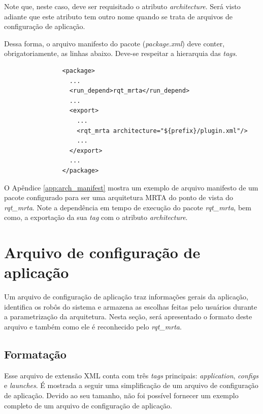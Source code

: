             Note que, neste caso, deve ser requisitado o atributo \textit{architecture}. Será visto adiante que este atributo tem outro nome quando se trata de arquivos de configuração de aplicação.
            
            Dessa forma, o arquivo manifesto do pacote (\textit{package.xml}) deve conter, obrigatoriamente, as linhas abaixo. Deve-se respeitar a hierarquia das \textit{tags}.
            
            \begin{lstlisting}
                <package>
                  ...
                  <run_depend>rqt_mrta</run_depend>
                  ...
                  <export>
                    ...
                    <rqt_mrta architecture="${prefix}/plugin.xml"/>
                    ...
                  </export>
                  ...
                </package>
            \end{lstlisting}
            
            O Apêndice \ref{app:arch_manifest} mostra um exemplo de arquivo manifesto de um pacote configurado para ser uma arquitetura MRTA do ponto de vista do \textit{rqt\_mrta}. Note a dependência em tempo de execução do pacote \textit{rqt\_mrta}, bem como, a exportação da sua \textit{tag} com o atributo \textit{architecture}.
    
    \section{Arquivo de configuração de aplicação} \label{sec:app_config}
        Um arquivo de configuração de aplicação traz informações gerais da aplicação, identifica os robôs do sistema e armazena as escolhas feitas pelo usuários durante a parametrização da arquitetura. Nesta seção, será apresentado o formato deste arquivo e também como ele é reconhecido pelo \textit{rqt\_mrta}.
        
        \subsection{Formatação} \label{subsec:app_config_fmt}
            Esse arquivo de extensão XML conta com três \textit{tags} principais: \textit{application}, \textit{configs} e \textit{launches}. É mostrada a seguir uma simplificação de um arquivo de configuração de aplicação. Devido ao seu tamanho, não foi possível fornecer um exemplo completo de um arquivo de configuração de aplicação. %
            
